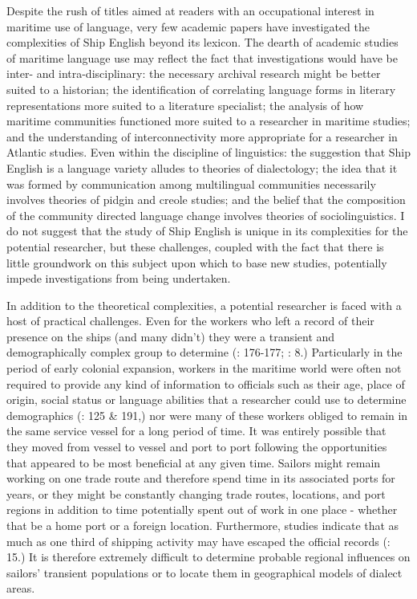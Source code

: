 Despite the rush of titles aimed at readers with an occupational interest in maritime use of language, very few academic papers have investigated the complexities of Ship English beyond its lexicon.  The dearth of academic studies of maritime language use may reflect the fact that investigations would have be inter- and intra-disciplinary: the necessary archival research might be better suited to a historian; the identification of correlating language forms in literary representations more suited to a literature specialist; the analysis of how maritime communities functioned more suited to a researcher in maritime studies; and the understanding of interconnectivity more appropriate for a researcher in Atlantic studies. Even within the discipline of linguistics: the suggestion that Ship English is a language variety alludes to theories of dialectology; the idea that it was formed by communication among multilingual communities necessarily involves theories of pidgin and creole studies; and the belief that the composition of the community directed language change involves theories of sociolinguistics. I do not suggest that the study of Ship English is unique in its complexities for the potential researcher, but these challenges, coupled with the fact that there is little groundwork on this subject upon which to base new studies, potentially impede investigations from being undertaken. 



  In addition to the theoretical complexities, a potential researcher is faced with a host of practical challenges. Even for the workers who left a record of their presence on the ships (and many didn’t) they were a transient and demographically complex group to determine (\citealt{AdkinsAdkins2008}: 176-177; \citealt{Fusaro2015}: 8.) Particularly in the period of early colonial expansion, workers in the maritime world were often not required to provide any kind of information to officials such as their age, place of origin, social status or language abilities that a researcher could use to determine demographics (\citealt{Litter1999}: 125 \& 191,) nor were many of these workers obliged to remain in the same service vessel for a long period of time. It was entirely possible that they moved from vessel to vessel and port to port following the opportunities that appeared to be most beneficial at any given time. Sailors might remain working on one trade route and therefore spend time in its associated ports for years, or they might be constantly changing trade routes, locations, and port regions in addition to time potentially spent out of work in one place - whether that be a home port or a foreign location. Furthermore, studies indicate that as much as one third of shipping activity may have escaped the official records (\citealt{Cook2005}: 15.) It is therefore extremely difficult to determine probable regional influences on sailors’ transient populations or to locate them in geographical models of dialect areas.



